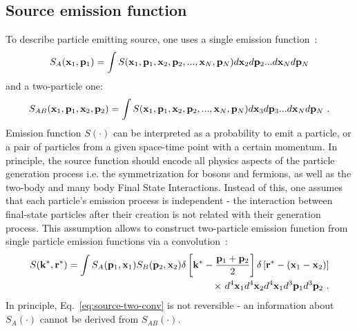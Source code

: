     \subsection{Source emission function}
    \label{sec:source-emission-function}
      To describe particle emitting source, one uses a single emission function~\cite{nonidfemto}:
      \begin{equation}
        \label{eq:source-single-3d}
        S_A(\mathbf{x}_1,\mathbf{p}_1) = \int S(\mathbf{x}_1,\mathbf{p}_1,\mathbf{x}_2,\mathbf{p}_2,...,\mathbf{x}_N,\mathbf{p}_N)
        d \mathbf{x}_2 d \mathbf{p}_2 ... d \mathbf{x}_N d \mathbf{p}_N
      \end{equation}
      and a two-particle one:
      \begin{equation}
        \label{eq:source-two-3d}
        S_{AB}(\mathbf{x}_1,\mathbf{p}_1,\mathbf{x}_2,\mathbf{p}_2) = \int S(\mathbf{x}_1,\mathbf{p}_1,\mathbf{x}_2,\mathbf{p}_2,...,\mathbf{x}_N,\mathbf{p}_N)
        d \mathbf{x}_3 d \mathbf{p}_3 ... d \mathbf{x}_N d \mathbf{p}_N~.
      \end{equation}
      Emission function $S(\cdot)$ can be interpreted as a probability to emit a particle, or a pair of particles from a given space-time point with a certain momentum.
      In principle, the source function should encode all physics aspects of the particle generation process i.e. the symmetrization for bosons and fermions, as well as the two-body and many body Final State Interactions.
      Instead of this, one assumes that each particle's emission process is independent - the interaction between final-state particles after their creation is not related with their generation process.
      This assumption allows to construct two-particle emission function from single particle emission functions via a convolution~\cite{nonidfemto}:
      \begin{equation}
        \label{eq:source-two-conv}
        \begin{split}
          S(\mathbf{k}^{*},\mathbf{r}^{*}) = \int S_A ( \mathbf{p}_1, \mathbf{x}_1 ) S_B ( \mathbf{p}_2, \mathbf{x}_2 )
          \delta \left[\mathbf{k}^{*} - \frac{\mathbf{p}_1+\mathbf{p}_2}{2} \right]
          \delta \left[\mathbf{r}^{*} - (\mathbf{x}_1-\mathbf{x}_2) \right] \\
          \times~d^4 \mathbf{x}_1 d^4 \mathbf{x}_2 d^4 \mathbf{x}_1 d^3 \mathbf{p}_1 d^3 \mathbf{p}_2~.
        \end{split}
      \end{equation}
      In principle, Eq.~\ref{eq:source-two-conv} is not reversible - an information about $S_A(\cdot)$ cannot be derived from $S_{AB}(\cdot)$.
